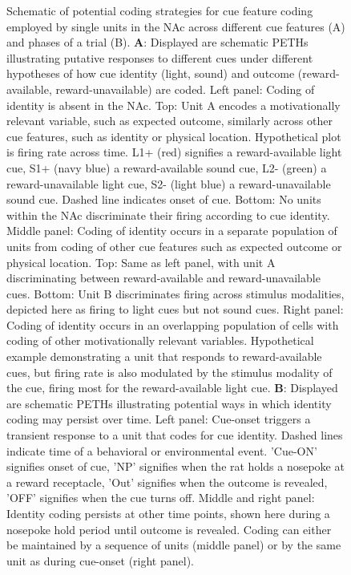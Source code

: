 \documentclass[11pt]{article}
\newcommand{\bsf}[1]{\textbf{#1}}
\begin{document}
\begin{figure}[ht!]
\caption{Schematic of potential coding strategies for cue feature coding employed by single units in the NAc across different cue features (A) and phases of a trial (B). \bsf{A}: Displayed are schematic PETHs illustrating putative responses to different cues under different hypotheses of how cue identity (light, sound) and outcome (reward-available, reward-unavailable) are coded. Left panel: Coding of identity is absent in the NAc. Top: Unit A encodes a motivationally relevant variable, such as expected outcome, similarly across other cue features, such as identity or physical location. Hypothetical plot is firing rate across time. L1+ (red) signifies a reward-available light cue, S1+ (navy blue) a reward-available sound cue, L2- (green) a reward-unavailable light cue, S2- (light blue) a reward-unavailable sound cue. Dashed line indicates onset of cue. Bottom: No units within the NAc discriminate their firing according to cue identity. Middle panel: Coding of identity occurs in a separate population of units from coding of other cue features such as expected outcome or physical location. Top: Same as left panel, with unit A discriminating between reward-available and reward-unavailable cues. Bottom: Unit B discriminates firing across stimulus modalities, depicted here as firing to light cues but not sound cues. Right panel: Coding of identity occurs in an overlapping population of cells with coding of other motivationally relevant variables. Hypothetical example demonstrating a unit that responds to reward-available cues, but firing rate is also modulated by the stimulus modality of the cue, firing most for the reward-available light cue. \bsf{B}: Displayed are schematic PETHs illustrating potential ways in which identity coding may persist over time. Left panel: Cue-onset triggers a transient response to a unit that codes for cue identity. Dashed lines indicate time of a behavioral or environmental event. 'Cue-ON' signifies onset of cue, 'NP' signifies when the rat holds a nosepoke at a reward receptacle, 'Out' signifies when the outcome is revealed, 'OFF' signifies when the cue turns off. Middle and right panel: Identity coding persists at other time points, shown here during a nosepoke hold period until outcome is revealed. Coding can either be maintained by a sequence of units (middle panel) or by the same unit as during cue-onset (right panel).}
\label{fig:schematic}
\end{figure} \clearpage
\end{document}
